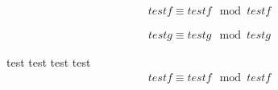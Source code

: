 
\begin{eqnarray*}
testf \equiv testf \mod testf
\end{eqnarray*}

\begin{eqnarray}
testg \equiv testg \mod testg
\end{eqnarray}

test test test test
\begin{eqnarray*}
testf \equiv testf \mod testf
\end{eqnarray*}